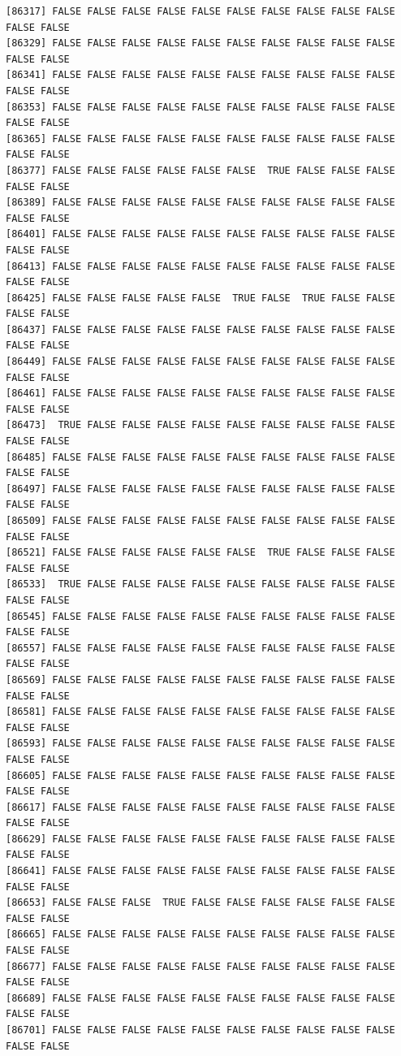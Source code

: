 \documentclass[
  a4paper,
  DIV=11,
  numbers=noendperiod]{scrartcl}
\begin{document}
\begin{verbatim}
[86317] FALSE FALSE FALSE FALSE FALSE FALSE FALSE FALSE FALSE FALSE FALSE FALSE
[86329] FALSE FALSE FALSE FALSE FALSE FALSE FALSE FALSE FALSE FALSE FALSE FALSE
[86341] FALSE FALSE FALSE FALSE FALSE FALSE FALSE FALSE FALSE FALSE FALSE FALSE
[86353] FALSE FALSE FALSE FALSE FALSE FALSE FALSE FALSE FALSE FALSE FALSE FALSE
[86365] FALSE FALSE FALSE FALSE FALSE FALSE FALSE FALSE FALSE FALSE FALSE FALSE
[86377] FALSE FALSE FALSE FALSE FALSE FALSE  TRUE FALSE FALSE FALSE FALSE FALSE
[86389] FALSE FALSE FALSE FALSE FALSE FALSE FALSE FALSE FALSE FALSE FALSE FALSE
[86401] FALSE FALSE FALSE FALSE FALSE FALSE FALSE FALSE FALSE FALSE FALSE FALSE
[86413] FALSE FALSE FALSE FALSE FALSE FALSE FALSE FALSE FALSE FALSE FALSE FALSE
[86425] FALSE FALSE FALSE FALSE FALSE  TRUE FALSE  TRUE FALSE FALSE FALSE FALSE
[86437] FALSE FALSE FALSE FALSE FALSE FALSE FALSE FALSE FALSE FALSE FALSE FALSE
[86449] FALSE FALSE FALSE FALSE FALSE FALSE FALSE FALSE FALSE FALSE FALSE FALSE
[86461] FALSE FALSE FALSE FALSE FALSE FALSE FALSE FALSE FALSE FALSE FALSE FALSE
[86473]  TRUE FALSE FALSE FALSE FALSE FALSE FALSE FALSE FALSE FALSE FALSE FALSE
[86485] FALSE FALSE FALSE FALSE FALSE FALSE FALSE FALSE FALSE FALSE FALSE FALSE
[86497] FALSE FALSE FALSE FALSE FALSE FALSE FALSE FALSE FALSE FALSE FALSE FALSE
[86509] FALSE FALSE FALSE FALSE FALSE FALSE FALSE FALSE FALSE FALSE FALSE FALSE
[86521] FALSE FALSE FALSE FALSE FALSE FALSE  TRUE FALSE FALSE FALSE FALSE FALSE
[86533]  TRUE FALSE FALSE FALSE FALSE FALSE FALSE FALSE FALSE FALSE FALSE FALSE
[86545] FALSE FALSE FALSE FALSE FALSE FALSE FALSE FALSE FALSE FALSE FALSE FALSE
[86557] FALSE FALSE FALSE FALSE FALSE FALSE FALSE FALSE FALSE FALSE FALSE FALSE
[86569] FALSE FALSE FALSE FALSE FALSE FALSE FALSE FALSE FALSE FALSE FALSE FALSE
[86581] FALSE FALSE FALSE FALSE FALSE FALSE FALSE FALSE FALSE FALSE FALSE FALSE
[86593] FALSE FALSE FALSE FALSE FALSE FALSE FALSE FALSE FALSE FALSE FALSE FALSE
[86605] FALSE FALSE FALSE FALSE FALSE FALSE FALSE FALSE FALSE FALSE FALSE FALSE
[86617] FALSE FALSE FALSE FALSE FALSE FALSE FALSE FALSE FALSE FALSE FALSE FALSE
[86629] FALSE FALSE FALSE FALSE FALSE FALSE FALSE FALSE FALSE FALSE FALSE FALSE
[86641] FALSE FALSE FALSE FALSE FALSE FALSE FALSE FALSE FALSE FALSE FALSE FALSE
[86653] FALSE FALSE FALSE  TRUE FALSE FALSE FALSE FALSE FALSE FALSE FALSE FALSE
[86665] FALSE FALSE FALSE FALSE FALSE FALSE FALSE FALSE FALSE FALSE FALSE FALSE
[86677] FALSE FALSE FALSE FALSE FALSE FALSE FALSE FALSE FALSE FALSE FALSE FALSE
[86689] FALSE FALSE FALSE FALSE FALSE FALSE FALSE FALSE FALSE FALSE FALSE FALSE
[86701] FALSE FALSE FALSE FALSE FALSE FALSE FALSE FALSE FALSE FALSE FALSE FALSE

\end{verbatim}
\end{document}
